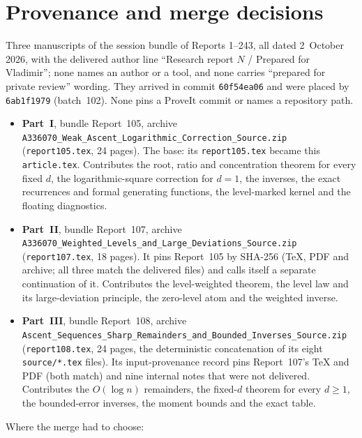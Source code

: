 \documentclass[11pt,a4paper]{article}
\newcommand{\file}[1]{\nolinkurl{#1}}
\theoremstyle{remark}\newtheorem{remark}[theorem]{Remark}
\numberwithin{equation}{section}
\begin{document}
\section*{Provenance and merge decisions}\label{wasc:sec:provenance}
Three manuscripts of the session bundle of Reports 1--243, all dated 2~October 2026, with the delivered author line ``Research report $N$ / Prepared for Vladimir''; none names an author or a tool, and none carries ``prepared for private review'' wording. They arrived in commit \texttt{60f54ea06} and were placed by \texttt{6ab1f1979} (batch~102). None pins a ProveIt commit or names a repository path.
\begin{itemize}
\item \textbf{Part~I}, bundle Report~105, archive \file{A336070_Weak_Ascent_Logarithmic_Correction_Source.zip} (\file{report105.tex}, 24 pages). The base: its \file{report105.tex} became this \file{article.tex}. Contributes the root, ratio and concentration theorem for every fixed $d$, the logarithmic-square correction for $d=1$, the inverses, the exact recurrences and formal generating functions, the level-marked kernel and the floating diagnostics.
\item \textbf{Part~II}, bundle Report~107, archive \file{A336070_Weighted_Levels_and_Large_Deviations_Source.zip} (\file{report107.tex}, 18 pages). It pins Report~105 by SHA-256 (TeX, PDF and archive; all three match the delivered files) and calls itself a separate continuation of it. Contributes the level-weighted theorem, the level law and its large-deviation principle, the zero-level atom and the weighted inverse.
\item \textbf{Part~III}, bundle Report~108, archive \file{Ascent_Sequences_Sharp_Remainders_and_Bounded_Inverses_Source.zip} (\file{report108.tex}, 24 pages, the deterministic concatenation of its eight \file{source/*.tex} files). Its input-provenance record pins Report~107's TeX and PDF (both match) and nine internal notes that were not delivered. Contributes the $O(\log n)$ remainders, the fixed-$d$ theorem for every $d\ge1$, the bounded-error inverses, the moment bounds and the exact table.
\end{itemize}
Where the merge had to choose:
\end{document}
